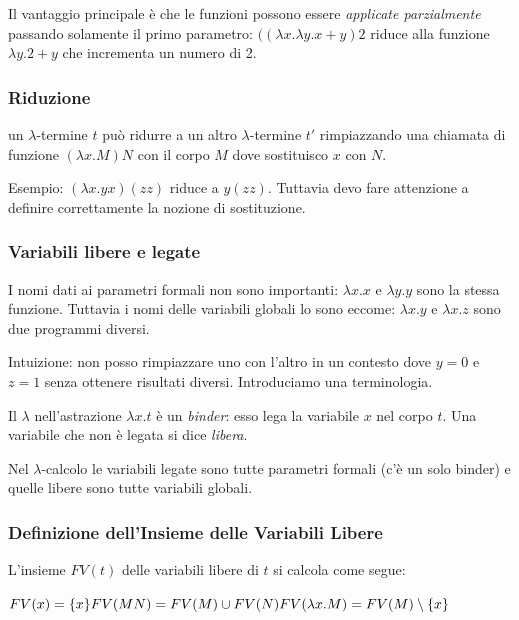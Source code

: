 \documentclass{article}
\begin{document}
\bigskip

Il vantaggio principale è che le funzioni possono essere \textit{applicate parzialmente} passando solamente il primo parametro: $((\lambda x.\lambda y.x+y)2$ riduce alla funzione $\lambda y.2+y$ che incrementa un numero di 2.

\subsubsection{Riduzione}
un $\lambda$-termine $t$ può ridurre a un altro $\lambda$-termine $t'$ rimpiazzando una chiamata di funzione $(\lambda x.M)N$ con il corpo $M$ dove sostituisco $x$ con $N$.

\bigskip

Esempio: $(\lambda x.yx)(zz)$ riduce a $y(zz)$. Tuttavia devo fare attenzione a definire correttamente la nozione di sostituzione.

\subsubsection{Variabili libere e legate}
I nomi dati ai parametri formali non sono importanti: $\lambda x.x$ e $\lambda y.y$ sono la stessa funzione. Tuttavia i nomi delle variabili globali lo sono eccome: $\lambda x.y$ e $\lambda x.z$ sono due programmi diversi.

\bigskip

Intuizione: non posso rimpiazzare uno con l’altro in un contesto dove $y = 0$ e $z = 1$ senza ottenere risultati diversi. Introduciamo una terminologia.

\bigskip

Il $\lambda$ nell'astrazione $\lambda x.t$ è un {\color{red}\textit{binder}}: esso lega la variabile $x$ nel corpo $t$. Una variabile che non è legata si dice {\color{red}\textit{libera}}.

\bigskip

Nel $\lambda$-calcolo le variabili legate sono tutte parametri formali (c'è un solo binder) e quelle libere sono tutte variabili globali.

\subsubsection{Definizione dell'Insieme delle Variabili Libere}
L'{\color{red}insieme $FV(t)$ delle variabili libere di $t$} si calcola come segue:

\bigskip

\noindent$
FV(x) = \{x\} \\
FV(MN) = FV(M) \cup FV(N) \\
FV(\lambda x.M) = FV(M) \setminus \{x\}$
\end{document}

